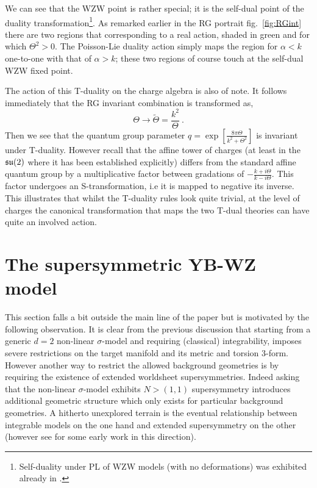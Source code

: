 \documentclass[12pt]{article}
\def\ee{\boldsymbol{e}}
\def\be{\begin{equation}}
\def\ee{\end{equation}}
\begin{document}
 We can see that the WZW point is rather special; it is the self-dual point of the duality transformation\footnote{Self-duality under PL of WZW models (with no deformations) was exhibited already in \cite{Klimcik:1996hp}.  }.   As remarked earlier in the RG portrait fig.~\ref{fig:RGint} there are two regions that corresponding to a real action, shaded in green and for which $\Theta^2 >0$.  The Poisson-Lie duality action simply maps the region for $\alpha<k$ one-to-one with that of $\alpha>k$; these two regions of course touch at the self-dual WZW fixed point. 
 
\noindent  The action of this T-duality on the charge algebra is also of note. It follows immediately that the RG invariant combination is transformed as,
 \be
 \Theta \to \tilde{\Theta}= \frac{k^{2}}{\Theta} \ .
 \ee
 Then we see that the quantum group parameter $q = \exp \left[ \frac{8 \pi \Theta} { k^2+\Theta^2 }\right]$ is invariant under T-duality.  However recall that the affine tower of charges (at least in the $\frak{su}(2)$ where it has been established explicitly) differs from the standard affine quantum group by a multiplicative factor between gradations of $- \frac{k+ i \Theta}{k-i \Theta}$.  This factor undergoes an S-transformation, i.e it is mapped to negative its inverse. This illustrates that whilst the T-duality rules look quite trivial, at the level of charges the canonical transformation that maps the two T-dual theories can have quite an involved action. 

    
\section{The supersymmetric YB-WZ model} \label{s6}
This section falls a bit outside the main line of the paper but is motivated by the following observation. It is clear from the previous discussion that starting from a generic $d=2$ non-linear $\sigma $-model and requiring (classical) integrability, imposes severe restrictions on the target manifold and its metric and  torsion 3-form. However another way to restrict the allowed background geometries is by requiring the existence of extended worldsheet supersymmetries.  Indeed asking that the non-linear $ \sigma $-model exhibits $N>(1,1)$ supersymmetry introduces additional geometric structure which only exists  for particular background geometries. A hitherto unexplored terrain is the eventual relationship between integrable models on the one hand and extended supersymmetry on the other (however see \cite{Figueirido:1988ct} for some early work in this direction).
\end{document}
